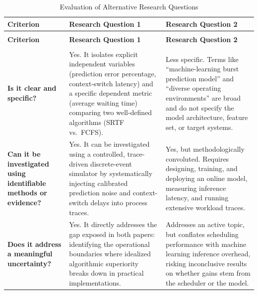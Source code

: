 \documentclass[11pt]{article}
\begin{document}
\vspace{0.5em}
{\small
\begin{longtable}{|>{\raggedright\arraybackslash}p{3.4cm}|>{\raggedright\arraybackslash}p{5.6cm}|>{\raggedright\arraybackslash}p{5.6cm}|}
    \caption{Evaluation of Alternative Research Questions}
    \label{tab:Research Question _evaluation} \\
    
    \hline
    \textbf{Criterion} & \textbf{Research Question 1 } & \textbf{Research Question 2 } \\
    \hline
    \endfirsthead 
    
    \multicolumn{3}{c}{\tablename\ \thetable\ -- \textit{Continued from previous page}} \\
    \hline
    \textbf{Criterion} & \textbf{Research Question 1 } & \textbf{Research Question 2 } \\
    \hline
    \endhead

    \hline
    \multicolumn{3}{r}{\textit{Continued on next page}} \\
    \endfoot

    \hline
    \endlastfoot

    \textbf{Is it clear and specific?} & 
    Yes. It isolates explicit independent variables (prediction error percentage, context-switch latency) and a specific dependent metric (average waiting time) comparing two well-defined algorithms (SRTF vs.\ FCFS). & 
    Less specific. Terms like ``machine-learning burst prediction model'' and ``diverse operating environments'' are broad and do not specify the model architecture, feature set, or target systems. \\
    \hline

    \textbf{Can it be investigated using identifiable methods or evidence?} & 
    Yes. It can be investigated using a controlled, trace-driven discrete-event simulator by systematically injecting calibrated prediction noise and context-switch delays into process traces. & 
    Yes, but methodologically convoluted. Requires designing, training, and deploying an online model, measuring inference latency, and running extensive workload traces. \\
    \hline

    \textbf{Does it address a meaningful uncertainty?} & 
    Yes. It directly addresses the gap exposed in both papers: identifying the operational boundaries where idealized algorithmic superiority breaks down in practical implementations. & 
    Addresses an active topic, but conflates scheduling performance with machine learning inference overhead, risking inconclusive results on whether gains stem from the scheduler or the model. \\
    \hline


\end{longtable}}
\end{document}
